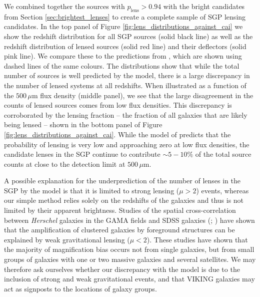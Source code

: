 We combined together the sources with $p_{\textrm{lens}} > 0.94$ with the bright candidates from Section \ref{sec:brightest_lenses} to create a complete sample of SGP lensing candidates. In the top panel of Figure \ref{fig:lens_distributions_against_cai} we show the redshift distribution for all SGP sources (solid black line) as well as the redshift distribution of lensed sources (solid red line) and their deflectors (solid pink line). We compare these to the predictions from \citealt{Cai_2013}, which are shown using dashed lines of the same colours. The distributions show that while the total number of sources is well predicted by the model, there is a large discrepancy in the number of lensed systems at all redshifts. When illustrated as a function of the $500\,\mu$m flux density (middle panel), we see that the large disagreement in the counts of lensed sources comes from low flux densities. This discrepancy is corroborated by the lensing fraction -- the fraction of all galaxies that are likely being lensed -- shown in the bottom panel of Figure \ref{fig:lens_distributions_against_cai}. While the model of \citealt{Cai_2013} predicts that the probability of lensing is very low and approaching zero at low flux densities, the candidate lenses in the SGP continue to contribute $\sim 5 - 10\%$ of the total source counts at close to the detection limit at $500\,\mu$m.

A possible explanation for the underprediction of the number of lenses in the SGP by the \citealt{Cai_2013} model is that it is limited to strong lensing ($\mu > 2$) events, whereas our simple method relies solely on the redshifts of the galaxies and thus is not limited by their apparent brightness. Studies of the spatial cross-correlation between \textit{Herschel} galaxies in the GAMA fields and SDSS galaxies (\citealt{Gonzalez-Nuevo_2014}; \citealt{Gonzalez-Nuevo_2017}) have shown that the amplification of clustered galaxies by foreground structures can be explained by weak gravitational lensing ($\mu < 2$). These studies have shown that the majority of magnification bias occurs not from single galaxies, but from small groups of galaxies with one or two massive galaxies and several satellites. We may therefore ask ourselves whether our discrepancy with the \cite{Cai_2013} model is due to the inclusion of strong and weak gravitational events, and that VIKING galaxies may act as signposts to the locations of galaxy groups.

